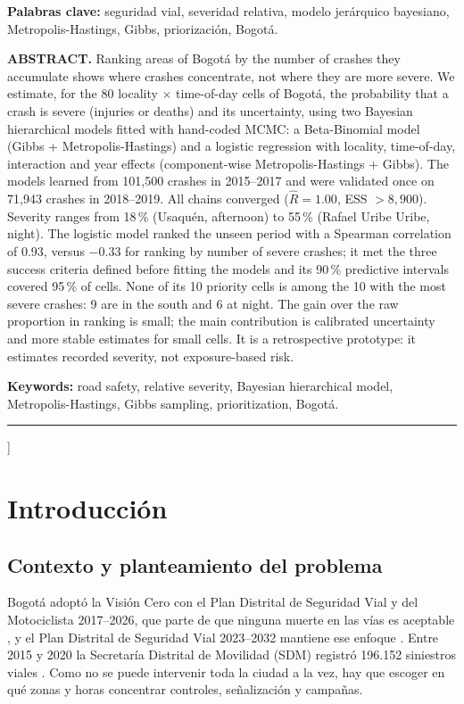 \documentclass[10pt,twocolumn]{article}
\begin{document}
{\begin{small}
\par\smallskip
\noindent\textbf{Palabras clave:} seguridad vial, severidad relativa, modelo jerárquico bayesiano, Metropolis-Hastings, Gibbs, priorización, Bogotá.
\par\medskip
\noindent\textbf{ABSTRACT.} Ranking areas of Bogotá by the number of crashes they accumulate shows where crashes concentrate, not where they are more severe. We estimate, for the 80 locality $\times$ time-of-day cells of Bogotá, the probability that a crash is severe (injuries or deaths) and its uncertainty, using two Bayesian hierarchical models fitted with hand-coded MCMC: a Beta-Binomial model (Gibbs + Metropolis-Hastings) and a logistic regression with locality, time-of-day, interaction and year effects (component-wise Metropolis-Hastings + Gibbs). The models learned from 101,500 crashes in 2015--2017 and were validated once on 71,943 crashes in 2018--2019. All chains converged ($\widehat R=1.00$, ESS $>8{,}900$). Severity ranges from 18\,\% (Usaquén, afternoon) to 55\,\% (Rafael Uribe Uribe, night). The logistic model ranked the unseen period with a Spearman correlation of 0.93, versus $-0.33$ for ranking by number of severe crashes; it met the three success criteria defined before fitting the models and its 90\,\% predictive intervals covered 95\,\% of cells. None of its 10 priority cells is among the 10 with the most severe crashes: 9 are in the south and 6 at night. The gain over the raw proportion in ranking is small; the main contribution is calibrated uncertainty and more stable estimates for small cells. It is a retrospective prototype: it estimates recorded severity, not exposure-based risk.
\par\smallskip
\noindent\textbf{Keywords:} road safety, relative severity, Bayesian hierarchical model, Metropolis-Hastings, Gibbs sampling, prioritization, Bogotá.
\end{small}
\par\noindent\rule{\textwidth}{0.4pt}
\vspace{6pt}
}]

\section{Introducción}
\subsection{Contexto y planteamiento del problema}
Bogotá adoptó la Visión Cero con el Plan Distrital de Seguridad Vial y del Motociclista 2017--2026, que parte de que ninguna muerte en las vías es aceptable \citep{alcaldia2018plan}, y el Plan Distrital de Seguridad Vial 2023--2032 mantiene ese enfoque \citep{bogota2023decreto494}. Entre 2015 y 2020 la Secretaría Distrital de Movilidad (SDM) registró 196.152 siniestros viales \citep{sdm2021datos}. Como no se puede intervenir toda la ciudad a la vez, hay que escoger en qué zonas y horas concentrar controles, señalización y campañas.
\end{document}
